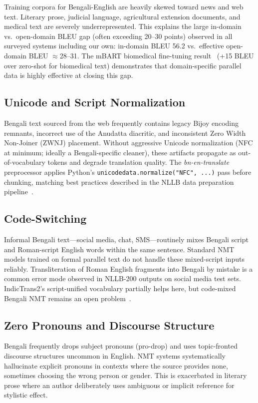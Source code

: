\documentclass[conference]{IEEEtran}
\begin{document}
Training corpora for Bengali-English are heavily skewed toward news and
web text.
Literary prose, judicial language, agricultural extension documents,
and medical text are severely underrepresented.
This explains the large in-domain vs.\ open-domain BLEU gap (often
exceeding 20--30 points) observed in all surveyed systems including
our own: in-domain BLEU 56.2 vs.\ effective open-domain BLEU
$\approx$28--31.
The mBART biomedical fine-tuning result~\cite{hasan2020low} (+15 BLEU
over zero-shot for biomedical text) demonstrates that domain-specific
parallel data is highly effective at closing this gap.

\subsection{Unicode and Script Normalization}

Bengali text sourced from the web frequently contains legacy Bijoy
encoding remnants, incorrect use of the Anudatta diacritic, and
inconsistent Zero Width Non-Joiner (ZWNJ) placement.
Without aggressive Unicode normalization (NFC at minimum; ideally
a Bengali-specific cleaner), these artifacts propagate as out-of-vocabulary
tokens and degrade translation quality.
The \textit{bn-en-translate} preprocessor applies Python's
\texttt{unicodedata.normalize("NFC", ...)} pass before chunking, matching
best practices described in the NLLB data preparation pipeline~\cite{nllb2022}.

\subsection{Code-Switching}

Informal Bengali text---social media, chat, SMS---routinely mixes Bengali
script and Roman-script English words within the same sentence.
Standard NMT models trained on formal parallel text do not handle
these mixed-script inputs reliably.
Transliteration of Roman English fragments into Bengali by mistake is a
common error mode observed in NLLB-200 outputs on social media test sets.
IndicTrans2's script-unified vocabulary partially helps here, but code-mixed
Bengali NMT remains an open problem~\cite{hasan2020low}.

\subsection{Zero Pronouns and Discourse Structure}

Bengali frequently drops subject pronouns (pro-drop) and uses
topic-fronted discourse structures uncommon in English.
NMT systems systematically hallucinate explicit pronouns in contexts
where the source provides none, sometimes choosing the wrong person or
gender.
This is exacerbated in literary prose where an author deliberately
uses ambiguous or implicit reference for stylistic effect.
\end{document}
